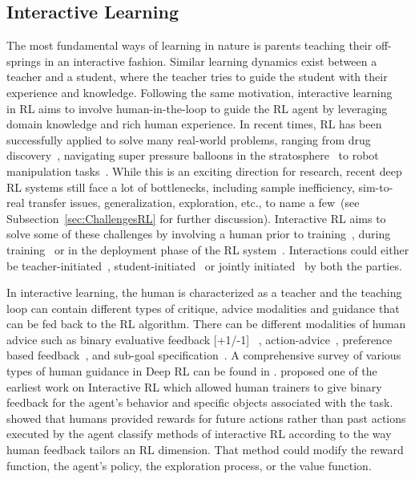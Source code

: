 \documentclass[twoside,11pt]{article}
\begin{document}
\subsection{Interactive Learning}
\label{sec:InteractiveLearning}
    
The most fundamental ways of learning in nature is parents teaching their off-springs in an interactive fashion. Similar learning dynamics exist between a teacher and a student, where the teacher tries to guide the student with their experience and knowledge. Following the same motivation, interactive learning~\citep{Arzate:2020:SurveyInteractiveRL} in RL aims to involve human-in-the-loop to guide the RL agent by leveraging domain knowledge and rich human experience. In recent times,  RL has been successfully applied to solve many real-world problems, ranging from drug discovery~\citep{popova2018deep}, navigating super pressure balloons in the stratosphere~\citep{bellemare2020autonomous} to robot manipulation tasks~\citep{nguyen2019review}. While this is an exciting direction for research, recent deep RL systems still face a lot of bottlenecks, including sample inefficiency, sim-to-real transfer issues, generalization, exploration, etc., to name a few~(see Subsection~\ref{sec:ChallengesRL} for further discussion)\citep{ibarz2021train}. Interactive RL aims to solve some of these challenges by involving a human prior to training~\citep{Guo:2022:RLSurveyHumanPriorKnowledge}, during training~\citep{Knox:2008:TAMER} or in the deployment phase of the RL system~\citep{guo2021edge}. Interactions could either be teacher-initiated~\citep{torrey2013teaching}, student-initiated~\citep{da2020uncertainty,MandelEtAl:2017ActionsInHITL} or jointly initiated~\citep{amir2016interactive} by both the parties.

In interactive learning, the human is characterized as a teacher and the teaching loop can contain different types of critique, advice modalities and guidance that can be fed back to the RL algorithm. There can be different modalities of human advice such as binary evaluative feedback [+1/-1] ~\citep{Knox:2008:TAMER}, action-advice~\citep{torrey2013teaching}, preference based feedback~\citep{Christiano:2017:DeepRLHumanPreferences,LeeSmithAbbeel:2021:FeedbackPreferenceHITLLearningPEBBLE}, and sub-goal specification~\citep{le2018hierarchical}. A comprehensive survey of various types of human guidance in Deep RL can be found in \citet{zhang2019leveraging}. \citet{Thomaz:2006:RLWithHumanTeachers} proposed one of the earliest work on Interactive RL which allowed human trainers to give binary feedback for the agent's behavior and specific objects associated with the task. \citet{Arzate:2020:SurveyInteractiveRL} showed that humans provided rewards for future actions rather than past actions executed by the agent  classify methods of interactive RL according to the way human feedback tailors an RL dimension. That method could modify the reward function, the agent's policy, the exploration process, or the value function.  
\end{document}
